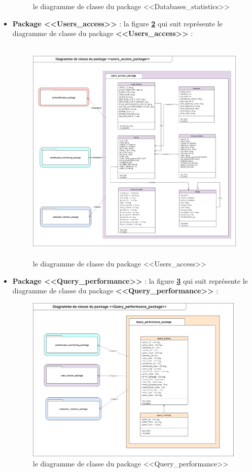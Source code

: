 \begin{itemize}
\begin{figure}[H]
                \caption{le diagramme de classe du package <<Databases\_statistics>>}
                \label{fig :class4}
                \end{figure}
                \item\textbf{Package <<Users\_access>>} : la figure \textbf{\ref{fig :class5}} qui suit représente le diagramme de classe du package \textbf{<<Users\_access>>} : 
            \begin{figure}[H]
                \centering
                \includegraphics[width =0.8\linewidth , height=11cm]{img/conception/class_access.png}
                \caption{le diagramme de classe du package <<Users\_access>>}
                \label{fig :class5}
                \end{figure}
                \item\textbf{Package <<Query\_performance>>} : la figure \textbf{\ref{fig :class6}} qui suit représente le diagramme de classe du package \textbf{<<Query\_performance>>} : 
                \begin{figure}[H]
                \centering
                \includegraphics[width =0.8\linewidth , height=8cm]{img/conception/class_query.png}
                \caption{le diagramme de classe du package <<Query\_performance>>}
                \label{fig :class6}
                \end{figure}
        \end{itemize}
        
